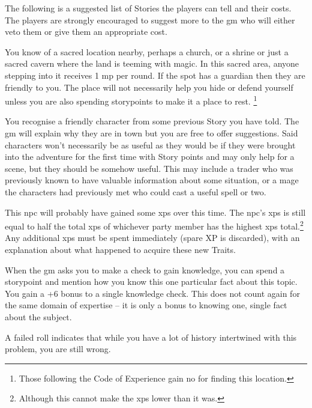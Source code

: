 \begin{multicols}{2}

\noindent
The following is a suggested list of Stories the players can tell and their costs. The players are strongly encouraged to suggest more to the \gls{gm} who will either veto them or give them an appropriate cost.

You know of a sacred location nearby, perhaps a church, or a shrine or just a sacred cavern where the land is teeming with magic.
In this sacred area, anyone stepping into it receives 1 \gls{mp} per \gls{round}.
If the spot has a guardian then they are friendly to you.
The place will not necessarily help you hide or defend yourself unless you are also spending \glspl{storypoint} to make it a place to rest.
\footnote{Those following the Code of Experience gain no  for finding this location.}

\label{oldnpc}
You recognise a friendly character from some previous Story you have told. The \gls{gm} will explain why they are in town but you are free to offer suggestions. Said characters won't necessarily be as useful as they would be if they were brought into the adventure for the first time with Story points and may only help for a scene, but they should be somehow useful. This may include a trader who was previously known to have valuable information about some situation, or a mage the characters had previously met who could cast a useful spell or two.

This \gls{npc} will probably have gained some \glspl{xp} over this time.
The \gls{npc}'s \glspl{xp} is still equal to half the total \glspl{xp} of whichever party member has the highest \glspl{xp} total.\footnote{Although this cannot make the \glspl{xp} lower than it was.}
Any additional \glspl{xp} must be spent immediately (spare XP is discarded), with an explanation about what happened to acquire these new Traits.

When the \gls{gm} asks you to make a check to gain knowledge, you can spend a \gls{storypoint} and mention how you know this one particular fact about this topic.
You gain a +6 bonus to a single knowledge check.
This does not count again for the same domain of expertise -- it is only a bonus to knowing one, single fact about the subject.

A failed roll indicates that while you have a lot of history intertwined with this problem, you are still wrong.


\end{multicols}
